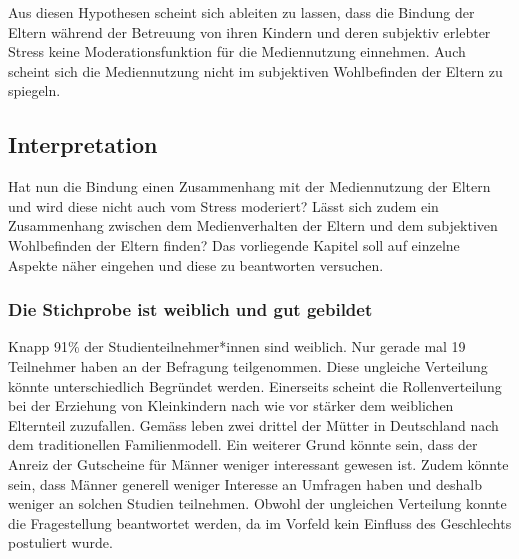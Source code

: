 Aus diesen Hypothesen scheint sich ableiten zu lassen, dass die Bindung der Eltern während der Betreuung von ihren Kindern und deren subjektiv erlebter Stress keine Moderationsfunktion für die Mediennutzung  einnehmen. Auch scheint sich die Mediennutzung nicht im subjektiven Wohlbefinden der Eltern zu spiegeln.

\subsection{Interpretation} \label{sec:Interpretation}
Hat nun die Bindung einen Zusammenhang mit der Mediennutzung der Eltern und wird diese nicht auch vom Stress moderiert? Lässt sich zudem ein Zusammenhang zwischen dem Medienverhalten der Eltern und dem subjektiven Wohlbefinden der Eltern finden? Das vorliegende Kapitel soll auf einzelne Aspekte näher eingehen und diese zu beantworten versuchen.

\subsubsection{Die Stichprobe ist weiblich und gut gebildet}
Knapp 91\% der Studienteilnehmer*innen sind weiblich. Nur gerade mal 19 Teilnehmer haben an der Befragung teilgenommen. Diese ungleiche Verteilung könnte unterschiedlich Begründet werden. Einerseits scheint die Rollenverteilung bei der Erziehung von Kleinkindern nach wie vor stärker dem weiblichen Elternteil zuzufallen. Gemäss  leben zwei drittel der Mütter in Deutschland nach dem traditionellen Familienmodell. Ein weiterer Grund könnte sein, dass der Anreiz der Gutscheine für Männer weniger interessant gewesen ist. Zudem könnte sein, dass Männer generell weniger Interesse an Umfragen haben und deshalb weniger an solchen Studien teilnehmen. Obwohl der ungleichen Verteilung konnte die Fragestellung beantwortet werden, da im Vorfeld kein Einfluss des Geschlechts postuliert wurde.

